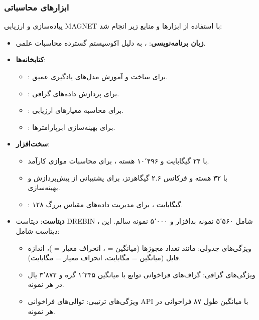 \subsubsection{ابزارهای محاسباتی}
پیاده‌سازی و ارزیابی MAGNET با استفاده از ابزارها و منابع زیر انجام شد:
\begin{itemize}
    \item \textbf{زبان برنامه‌نویسی}: ، به دلیل اکوسیستم گسترده محاسبات علمی.
    \item \textbf{کتابخانه‌ها}:
        \begin{itemize}
            \item {}: برای ساخت و آموزش مدل‌های یادگیری عمیق.
            \item {}: برای پردازش داده‌های گرافی.
            \item {}: برای محاسبه معیارهای ارزیابی.
            \item {}: برای بهینه‌سازی ابرپارامترها.
        \end{itemize}
    \item \textbf{سخت‌افزار}:
        \begin{itemize}
            \item {} با ۲۴ گیگابایت  و ۱۰٬۴۹۶ هسته ، برای محاسبات موازی کارآمد.
            \item {} با ۳۲ هسته و فرکانس ۲.۶ گیگاهرتز، برای پشتیبانی از پیش‌پردازش و بهینه‌سازی.
            \item {}: ۱۲۸ گیگابایت ، برای مدیریت داده‌های مقیاس بزرگ.
        \end{itemize}
    \item \textbf{دیتاست}: دیتاست DREBIN \cite{Drebin}، شامل ۵٬۵۶۰ نمونه بدافزار و ۵٬۰۰۰ نمونه سالم. این دیتاست شامل:
        \begin{itemize}
            \item ویژگی‌های جدولی: مانند تعداد مجوزها (میانگین = ، انحراف معیار = )، اندازه فایل (میانگین =  مگابایت، انحراف معیار =  مگابایت).
            \item ویژگی‌های گرافی: گراف‌های فراخوانی توابع با میانگین ۱٬۲۴۵ گره و ۳٬۸۷۲ یال در هر نمونه.
            \item ویژگی‌های ترتیبی: توالی‌های فراخوانی API با میانگین طول ۸۷ فراخوانی در هر نمونه.
        \end{itemize}
\end{itemize}

